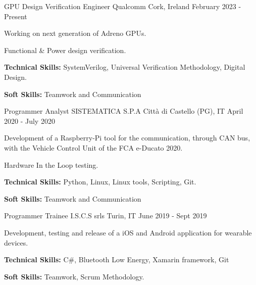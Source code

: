 

\begin{cventries}

  \cventry
    {GPU Design Verification Engineer} %
    {Qualcomm} %
    {Cork, Ireland} %
    {February 2023 - Present} %
    {
      \begin{cvitems} %
        \item {Working on next generation of Adreno GPUs.}
        \item {Functional \& Power design verification.}
        \item {\textbf{Technical Skills:} SystemVerilog, Universal Verification Methodology, Digital Design.}
        \item {\textbf{Soft Skills:} Teamwork and Communication}
      \end{cvitems}
    }

  \cventry
    {Programmer Analyst} %
    {SISTEMATICA S.P.A} %
    {Città di Castello (PG), IT} %
    {April 2020 - July 2020} %
    {
      \begin{cvitems} %
        \item {Development of a Raspberry-Pi tool for the communication, through CAN bus, with the Vehicle Control Unit of the FCA e-Ducato 2020.}
        \item {Hardware In the Loop testing.}
        \item {\textbf{Technical Skills:} Python, Linux, Linux tools, Scripting, Git.}
        \item {\textbf{Soft Skills:} Teamwork and Communication}
      \end{cvitems}
    }

  \cventry
    {Programmer Trainee} %
    {I.S.C.S srls} %
    {Turin, IT} %
    {June 2019 - Sept 2019} %
    {
      \begin{cvitems} %
        \item {Development, testing and release of a iOS and Android application for wearable devices.}
        \item {\textbf{Technical Skills:} C\#, Bluetooth Low Energy, Xamarin framework, Git}
        \item {\textbf{Soft Skills:} Teamwork, Scrum Methodology.}
      \end{cvitems}
    }

\end{cventries}
